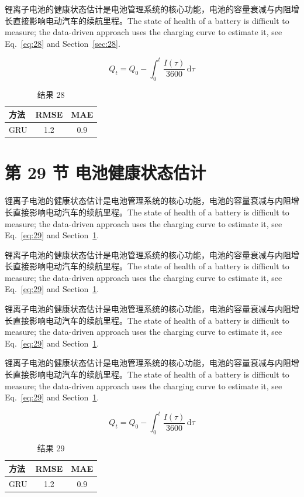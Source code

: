 \documentclass[UTF8,fontset=mac]{ctexart}
\begin{document}
锂离子电池的健康状态估计是电池管理系统的核心功能，电池的容量衰减与内阻增长直接影响电动汽车的续航里程\cite{a2020}。The state of health of a battery is difficult to measure; the data-driven approach uses the charging curve to estimate it, see Eq.~\eqref{eq:28} and Section~\ref{sec:28}.

\begin{equation}\label{eq:28}
  Q_t = Q_0 - \int_0^t \frac{I(\tau)}{3600}\,\mathrm{d}\tau
\end{equation}
\begin{table}[h]\centering\begin{tabular}{lcc}\toprule 方法 & RMSE & MAE\\\midrule GRU & 1.2 & 0.9\\\bottomrule\end{tabular}\caption{结果 28}\end{table}

\section{第 29 节 电池健康状态估计}\label{sec:29}
锂离子电池的健康状态估计是电池管理系统的核心功能，电池的容量衰减与内阻增长直接影响电动汽车的续航里程\cite{a2020}。The state of health of a battery is difficult to measure; the data-driven approach uses the charging curve to estimate it, see Eq.~\eqref{eq:29} and Section~\ref{sec:29}.

锂离子电池的健康状态估计是电池管理系统的核心功能，电池的容量衰减与内阻增长直接影响电动汽车的续航里程\cite{a2020}。The state of health of a battery is difficult to measure; the data-driven approach uses the charging curve to estimate it, see Eq.~\eqref{eq:29} and Section~\ref{sec:29}.

锂离子电池的健康状态估计是电池管理系统的核心功能，电池的容量衰减与内阻增长直接影响电动汽车的续航里程\cite{a2020}。The state of health of a battery is difficult to measure; the data-driven approach uses the charging curve to estimate it, see Eq.~\eqref{eq:29} and Section~\ref{sec:29}.

锂离子电池的健康状态估计是电池管理系统的核心功能，电池的容量衰减与内阻增长直接影响电动汽车的续航里程\cite{a2020}。The state of health of a battery is difficult to measure; the data-driven approach uses the charging curve to estimate it, see Eq.~\eqref{eq:29} and Section~\ref{sec:29}.

\begin{equation}\label{eq:29}
  Q_t = Q_0 - \int_0^t \frac{I(\tau)}{3600}\,\mathrm{d}\tau
\end{equation}
\begin{table}[h]\centering\begin{tabular}{lcc}\toprule 方法 & RMSE & MAE\\\midrule GRU & 1.2 & 0.9\\\bottomrule\end{tabular}\caption{结果 29}\end{table}
\end{document}

